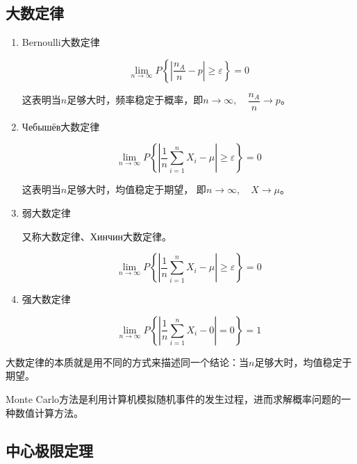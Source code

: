 \documentclass[UTF8,fontset=fandol,zihao=5]{ctexart}
\begin{document}
\subsection{大数定律}

\begin{enumerate}
  \item Bernoulli大数定律
  
  \[
  \lim_{n\to\infty} P\left\{\left|\frac{n_A}{n} - p\right| \geq \varepsilon\right\} = 0
  \]

  这表明当$n$足够大时，频率稳定于概率，即$n\to\infty,\quad\dfrac{n_A}{n}\to p$。

  \item {\russianserif Чебышёв}大数定律
  
  \[
  \lim_{n\to\infty} P\left\{\left|\frac{1}{n}\sum_{i=1}^{n}X_i - \mu\right| \geq \varepsilon\right\} = 0
  \]

  这表明当$n$足够大时，均值稳定于期望，
  即$n\to\infty,\quad X \to \mu$。

  \item 弱大数定律
  
  又称大数定律、{\russianserif Хинчин}大数定律。

  \[
  \lim_{n\to\infty} P\left\{\left|\frac{1}{n}\sum_{i=1}^{n}X_i - \mu\right| \geq \varepsilon\right\} = 0
  \]
  
  \item 强大数定律
  
  \[
  \lim_{n\to\infty} P\left\{\left|\frac{1}{n}\sum_{i=1}^{n}X_i - 0\right| = 0\right\} = 1
  \]
\end{enumerate}

\begin{methodbox}
  大数定律的本质就是用不同的方式来描述同一个结论：当$n$足够大时，均值稳定于期望。
\end{methodbox}

\begin{methodbox}
  Monte Carlo方法是利用计算机模拟随机事件的发生过程，进而求解概率问题的一种数值计算方法。
  
\end{methodbox}
\subsection{中心极限定理}
\end{document}
